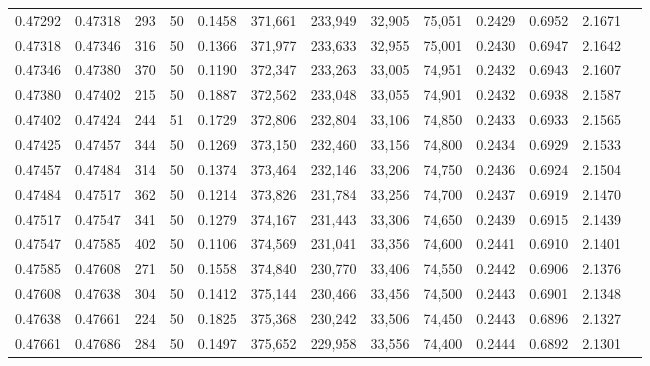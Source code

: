 \begin{tabular}{rrrrrrrrrrrrr}
0.47292 & 0.47318 &   293 &  50 &                                     0.1458 & 371,661 & 233,949 &  32,905 &  75,051 & 0.2429 & 0.6952 & 2.1671 \\
0.47318 & 0.47346 &   316 &  50 &                                     0.1366 & 371,977 & 233,633 &  32,955 &  75,001 & 0.2430 & 0.6947 & 2.1642 \\
0.47346 & 0.47380 &   370 &  50 &                                     0.1190 & 372,347 & 233,263 &  33,005 &  74,951 & 0.2432 & 0.6943 & 2.1607 \\
0.47380 & 0.47402 &   215 &  50 &                                     0.1887 & 372,562 & 233,048 &  33,055 &  74,901 & 0.2432 & 0.6938 & 2.1587 \\
0.47402 & 0.47424 &   244 &  51 &                                     0.1729 & 372,806 & 232,804 &  33,106 &  74,850 & 0.2433 & 0.6933 & 2.1565 \\
0.47425 & 0.47457 &   344 &  50 &                                     0.1269 & 373,150 & 232,460 &  33,156 &  74,800 & 0.2434 & 0.6929 & 2.1533 \\
0.47457 & 0.47484 &   314 &  50 &                                     0.1374 & 373,464 & 232,146 &  33,206 &  74,750 & 0.2436 & 0.6924 & 2.1504 \\
0.47484 & 0.47517 &   362 &  50 &                                     0.1214 & 373,826 & 231,784 &  33,256 &  74,700 & 0.2437 & 0.6919 & 2.1470 \\
0.47517 & 0.47547 &   341 &  50 &                                     0.1279 & 374,167 & 231,443 &  33,306 &  74,650 & 0.2439 & 0.6915 & 2.1439 \\
0.47547 & 0.47585 &   402 &  50 &                                     0.1106 & 374,569 & 231,041 &  33,356 &  74,600 & 0.2441 & 0.6910 & 2.1401 \\
0.47585 & 0.47608 &   271 &  50 &                                     0.1558 & 374,840 & 230,770 &  33,406 &  74,550 & 0.2442 & 0.6906 & 2.1376 \\
0.47608 & 0.47638 &   304 &  50 &                                     0.1412 & 375,144 & 230,466 &  33,456 &  74,500 & 0.2443 & 0.6901 & 2.1348 \\
0.47638 & 0.47661 &   224 &  50 &                                     0.1825 & 375,368 & 230,242 &  33,506 &  74,450 & 0.2443 & 0.6896 & 2.1327 \\
0.47661 & 0.47686 &   284 &  50 &                                     0.1497 & 375,652 & 229,958 &  33,556 &  74,400 & 0.2444 & 0.6892 & 2.1301 \\

\end{tabular}
